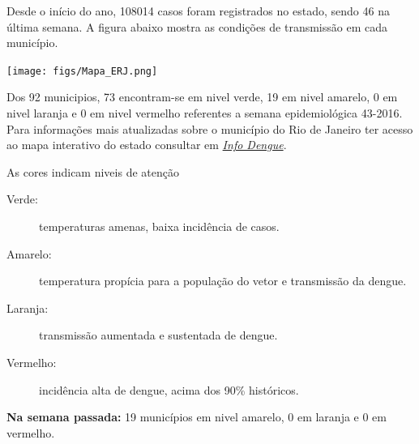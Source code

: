 \documentclass[10pt]{article} %
\begin{document}
\begin{minipage}[t]{.66\linewidth} %

\hypertarget{estado}{} %

Desde o início do ano, 108014 casos foram registrados no estado, sendo 46 na última semana. A figura abaixo mostra as condições de transmissão em cada município.

\texttt{[image: figs/Mapa\_ERJ.png]}

Dos 92 municipios, 73 encontram-se em nivel verde, 19 em nivel amarelo, 0 em nivel laranja e 0 em nivel vermelho referentes a semana epidemiológica 43-2016. Para informações mais atualizadas
sobre o município do Rio de Janeiro ter acesso ao mapa interativo do estado consultar em \href{http://info.dengue.mat.br}{\textit{Info Dengue}}.


\vspace{1cm}
\begin{mdframed}[style=intextbox,frametitle={}] %

\hypertarget{descriptivebox}{} %
As cores indicam niveis de atenção
\begin{description}
\item[Verde:] temperaturas amenas, baixa incidência de casos.      
\item[Amarelo:] temperatura propícia para a população do vetor e transmissão da dengue.
\item[Laranja:] transmissão aumentada e sustentada de dengue. 
\item[Vermelho:] incidência alta de dengue, acima dos 90\% históricos.
\end{description}
\end{mdframed}

 \textbf{Na semana passada:} 19 municípios em nivel amarelo, 0 em laranja e 0 em vermelho.    

\end{minipage} %
\end{document}
